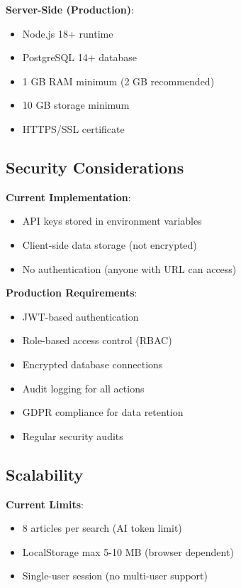 \documentclass[11pt,a4paper]{article}
\begin{document}
\textbf{Server-Side (Production)}:
\begin{itemize}[leftmargin=*]
    \item Node.js 18+ runtime
    \item PostgreSQL 14+ database
    \item 1 GB RAM minimum (2 GB recommended)
    \item 10 GB storage minimum
    \item HTTPS/SSL certificate
\end{itemize}

\subsection{Security Considerations}

\textbf{Current Implementation}:
\begin{itemize}[leftmargin=*]
    \item API keys stored in environment variables
    \item Client-side data storage (not encrypted)
    \item No authentication (anyone with URL can access)
\end{itemize}

\textbf{Production Requirements}:
\begin{itemize}[leftmargin=*]
    \item JWT-based authentication
    \item Role-based access control (RBAC)
    \item Encrypted database connections
    \item Audit logging for all actions
    \item GDPR compliance for data retention
    \item Regular security audits
\end{itemize}

\subsection{Scalability}

\textbf{Current Limits}:
\begin{itemize}[leftmargin=*]
    \item 8 articles per search (AI token limit)
    \item LocalStorage max 5-10 MB (browser dependent)
    \item Single-user session (no multi-user support)
\end{itemize}
\end{document}
